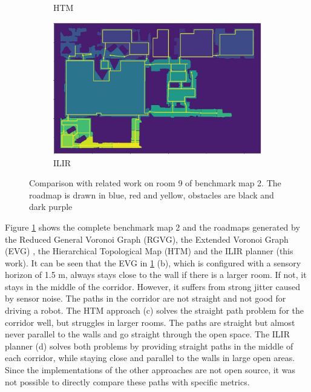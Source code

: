 \begin{figure}[h]
\begin{subfigure}{.5\textwidth}
      \caption{HTM \cite{hou_straight_2021}}
    \end{subfigure}%
    \begin{subfigure}{.5\textwidth}
      \centering
      \includegraphics[width=\textwidth]{figures/60_results/hou2_roadmap_ilir.png}
      \caption{ILIR}
    \end{subfigure}
    \caption[Comparison with related work on room 9 of benchmark map 2]{Comparison with related work on room 9 of benchmark map 2. The roadmap is drawn in blue, red and yellow, obstacles are black and dark purple}
    \label{fig:hou_comparison}
\end{figure}

Figure \ref{fig:hou_comparison} shows the complete benchmark map 2 and the roadmaps generated by the Reduced General Voronoi Graph (RGVG), the Extended Voronoi Graph (EVG) \cite{beeson_towards_2005}, the Hierarchical Topological Map (HTM) \cite{hou_straight_2021} and the ILIR planner (this work). It can be seen that the EVG in \ref{fig:hou_comparison} (b), which is configured with a sensory horizon of 1.5 m, always stays close to the wall if there is a larger room. If not, it stays in the middle of the corridor. However, it suffers from strong jitter caused by sensor noise. The paths in the corridor are not straight and not good for driving a robot. The HTM approach (c) solves the straight path problem for the corridor well, but struggles in larger rooms. The paths are straight but almost never parallel to the walls and go straight through the open space. The ILIR planner (d) solves both problems by providing straight paths in the middle of each corridor, while staying close and parallel to the walls in large open areas. Since the implementations of the other approaches are not open source, it was not possible to directly compare these paths with specific metrics.

